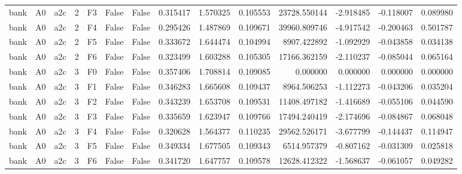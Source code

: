 \begin{tabular}{lllrlllrrrrrrr}
      bank &      A0 &       a2c &     2 &  F3 &           False &            False &  0.315417 &  1.570325 & 0.105553 &     23728.550144 &          -2.918485 &       -0.118007 &            0.089980 \\
      bank &      A0 &       a2c &     2 &  F4 &           False &            False &  0.295426 &  1.487869 & 0.109671 &     39960.809746 &          -4.917542 &       -0.200463 &            0.501787 \\
      bank &      A0 &       a2c &     2 &  F5 &           False &            False &  0.333672 &  1.644474 & 0.104994 &      8907.422892 &          -1.092929 &       -0.043858 &            0.034138 \\
      bank &      A0 &       a2c &     2 &  F6 &           False &            False &  0.323499 &  1.603288 & 0.105305 &     17166.362159 &          -2.110237 &       -0.085044 &            0.065164 \\
      bank &      A0 &       a2c &     3 &  F0 &           False &            False &  0.357406 &  1.708814 & 0.109085 &         0.000000 &           0.000000 &        0.000000 &            0.000000 \\
      bank &      A0 &       a2c &     3 &  F1 &           False &            False &  0.346283 &  1.665608 & 0.109437 &      8964.506253 &          -1.112273 &       -0.043206 &            0.035204 \\
      bank &      A0 &       a2c &     3 &  F2 &           False &            False &  0.343239 &  1.653708 & 0.109531 &     11408.497182 &          -1.416689 &       -0.055106 &            0.044590 \\
      bank &      A0 &       a2c &     3 &  F3 &           False &            False &  0.335659 &  1.623947 & 0.109766 &     17494.240419 &          -2.174696 &       -0.084867 &            0.068048 \\
      bank &      A0 &       a2c &     3 &  F4 &           False &            False &  0.320628 &  1.564377 & 0.110235 &     29562.526171 &          -3.677799 &       -0.144437 &            0.114947 \\
      bank &      A0 &       a2c &     3 &  F5 &           False &            False &  0.349334 &  1.677505 & 0.109343 &      6514.957379 &          -0.807162 &       -0.031309 &            0.025818 \\
      bank &      A0 &       a2c &     3 &  F6 &           False &            False &  0.341720 &  1.647757 & 0.109578 &     12628.412322 &          -1.568637 &       -0.061057 &            0.049282 \\

\end{tabular}
